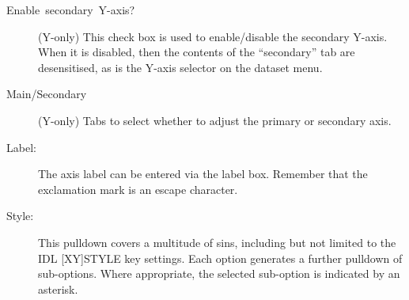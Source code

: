 \documentclass[11pt,twoside,english]{article}
\begin{document}
\begin{description}
\item[Enable~secondary~Y-axis?] (Y-only) This check box is used to
  enable/disable the secondary Y-axis. When it is disabled, then the
  contents of the ``secondary'' tab are desensitised, as is the Y-axis
  selector on the dataset menu.
\item[Main/Secondary] (Y-only) Tabs to select whether to adjust the
  primary or secondary axis.
\item [Label:]The axis label can be entered via the label box. Remember
  that the exclamation mark is an escape character.
\item [Style:]This pulldown covers a multitude of sins, including but
  not limited to the IDL {[}XY{]}STYLE key settings. Each option
  generates a further pulldown of sub-options. Where appropriate, the
  selected sub-option is indicated by an asterisk.


\end{description}
\end{document}

